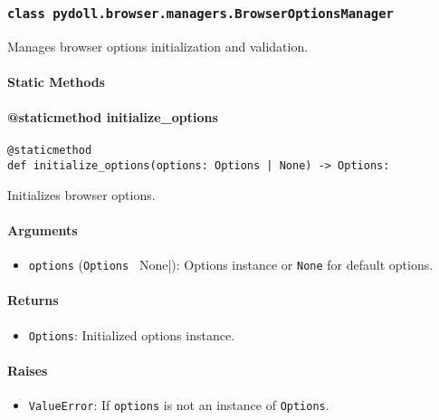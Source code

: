 \documentclass{article}
\begin{document}
\subsubsection*{\texttt{class pydoll.browser.managers.BrowserOptionsManager}}
\noindent Manages browser options initialization and validation.

\paragraph{Static Methods}
\paragraph{@staticmethod initialize\_options}

\begin{lstlisting}[style=pythonstyle]
@staticmethod
def initialize_options(options: Options | None) -> Options:
\end{lstlisting}

\noindent Initializes browser options.

\paragraph{Arguments}

\begin{itemize}
    \item \lstinline[style=pythonstyle]|options| (\lstinline[style=pythonstyle]|Options | None|): Options instance or \lstinline[style=pythonstyle]|None| for default options.
\end{itemize}

\paragraph{Returns}

\begin{itemize}
    \item \lstinline[style=pythonstyle]|Options|: Initialized options instance.
\end{itemize}

\paragraph{Raises}

\begin{itemize}
    \item \lstinline[style=pythonstyle]|ValueError|: If \lstinline[style=pythonstyle]|options| is not an instance of \lstinline[style=pythonstyle]|Options|.
\end{itemize}
\end{document}

